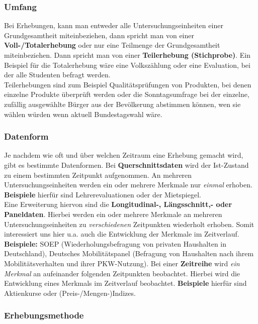 \documentclass[a4paper]{article}
\begin{document}
\subsubsection{Umfang}
Bei Erhebungen, kann man entweder alle Untersuchungseinheiten einer Grundgesamtheit miteinbeziehen, dann spricht man von einer \textbf{Voll-/Totalerhebung} oder nur eine Teilmenge der Grundgesamtheit miteinbeziehen. Dann spricht man von einer \textbf{Teilerhebung (Stichprobe)}.
Ein Beispiel für die Totalerhebung wäre eine Volkszählung oder eine Evaluation, bei der alle Studenten befragt werden.\\
Teilerhebungen sind zum Beispiel Qualitätsprüfungen von Produkten, bei denen einzelne Produkte überprüft werden oder die Sonntagsumfrage bei der einzelne, zufällig ausgewählte Bürger aus der Bevölkerung abstimmen können, wen sie wählen würden wenn aktuell Bundestagswahl wäre.

\subsubsection{Datenform}
Je nachdem wie oft und über welchen Zeitraum eine Erhebung gemacht wird, gibt es bestimmte Datenformen.
Bei \textbf{Querschnittsdaten} wird der Ist-Zustand zu einem bestimmten Zeitpunkt aufgenommen. An mehreren Untersuchungseinheiten werden ein oder mehrere Merkmale nur \textit{einmal} erhoben. \textbf{Beispiele} hierfür sind Lehrerevaluationen oder der Mietspiegel.\\
Eine Erweiterung hiervon sind die \textbf{Longitudinal-, Längsschnitt,- oder Paneldaten}. Hierbei werden ein oder mehrere Merkmale an mehreren Untersuchungseinheiten zu \textit{verschiedenen} Zeitpunkten wiederholt erhoben. Somit interessiert uns hier u.a. auch die Entwicklung der Merkmale im Zeitverlauf.\\
\textbf{Beispiele:} SOEP (Wiederholungsbefragung von privaten Haushalten in Deutschland), Deutsches Mobilitätspanel (Befragung von Haushalten nach ihrem Mobilitätsverhalten und ihrer PKW-Nutzung).
Bei einer \textbf{Zeitreihe} wird \textit{ein Merkmal} an aufeinander folgenden Zeitpunkten beobachtet. Hierbei wird die Entwicklung eines Merkmals im Zeitverlauf beobachtet. \textbf{Beispiele} hierfür sind Aktienkurse oder (Preis-/Mengen-)Indizes.

\subsubsection{Erhebungsmethode}
\end{document}
